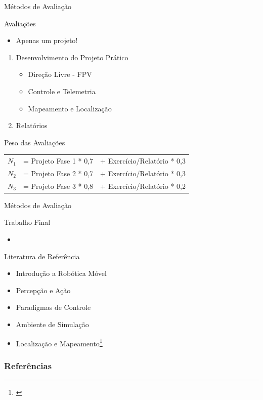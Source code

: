 \documentclass{beamer}
\begin{document}
\begin{frame}{Métodos de Avaliação}
	\begin{block}{Avaliações}
	\begin{itemize}
		\item Apenas um projeto!
	\end{itemize}
		\begin{enumerate}
			\item Desenvolvimento do Projeto Prático
				\begin{itemize}
					\item Direção Livre - FPV
					\item Controle e Telemetria
					\item Mapeamento e Localização
				\end{itemize}
			\item Relatórios
		\end{enumerate}
	\end{block}
	\begin{block}{Peso das Avaliações}
		\begin{tabular}{lll}
			\hline
			$N_1$ &= Projeto Fase 1 * 0,7&+ Exercício/Relatório * 0,3\\ 
			$N_2$ &= Projeto Fase 2 * 0,7&+ Exercício/Relatório * 0,3 \\ 
			$N_3$ &= Projeto Fase 3 * 0,8&+ Exercício/Relatório * 0,2 \\ 
			\hline
		\end{tabular}
	\end{block}
\end{frame}



\begin{frame}{Métodos de Avaliação}
	\begin{block}{Trabalho Final}
	\end{block}
	\begin{itemize}
		\item \href{https://www.youtube.com/watch?v=uCaOzrZ8wls}{}
	\end{itemize}
\end{frame}


\begin{frame}{Literatura de Referência}
	\begin{itemize}
		\item Introdução a Robótica Móvel
		\item Percepção e Ação
		\item Paradigmas de Controle
		\item Ambiente de Simulação
		\item Localização e Mapeamento\footnote{\cite{thrun2000probabilistic}}
	\end{itemize} 
\end{frame}

\begin{frame}[t, allowframebreaks]
	\frametitle{Referências}
	
\end{frame}
  
\end{document}
